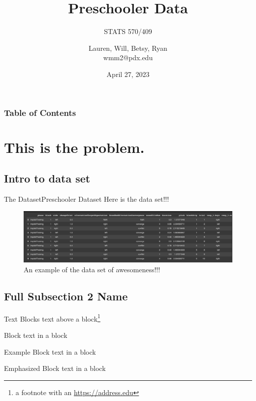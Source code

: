 \documentclass[
]{beamer}
\title[Mid-Project Update]{Preschooler Data}
\subtitle[Short Subtitle]{STATS 570/409}
\author[Data Whisperers]{Lauren, Will, Betsy, Ryan\texorpdfstring{\\}{, }wmm2@pdx.edu}
\institute[PSU]{Portland State University}
\date{April 27, 2023}
\begin{document}
\begin{frame}%
\maketitle
\end{frame}

\begin{frame}
\frametitle{Table of Contents}
\tableofcontents
\end{frame}
\section[Short Section 1 Name]{This is the problem.}
\subsection[Short Subsection 1 Name]{Intro to data set}

\begin{frame}{The Dataset}{Preschooler Dataset}
Here is the data set!!!
\begin{figure}[h]
\centering
\includegraphics[scale=0.25]{slides/images/dataset.png}
\caption{An example of the data set of awesomeness!!!}
\label{fig:x cubed graph}
\end{figure}
\end{frame}


\subsection[Short Subsection 2 Name]{Full Subsection 2 Name}

\begin{frame}{Text Blocks}
text above a block\footnote{a footnote with an \url{https://address.edu}}
\begin{block}{Block}
  text in a block
\end{block}
\begin{exampleblock}{Example Block}
  text in a block
\end{exampleblock}
\begin{alertblock}{Emphasized Block}
  text in a block
\end{alertblock}
\end{frame}
\end{document}
